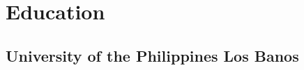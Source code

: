 \documentclass[top=0in]{deedy-resume-openfont}
\begin{document}
\begin{minipage}[t]{0.66\textwidth}

\section{Education} 

\subsection{University of the Philippines Los Banos}
\sectionsep



%
%


\end{minipage}
\end{document}
